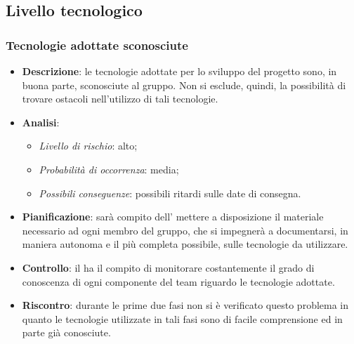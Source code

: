 	\subsection{Livello tecnologico}
		\subsubsection{Tecnologie adottate sconosciute}
			\begin{itemize}
				\item \textbf{Descrizione}: le tecnologie adottate per lo sviluppo del progetto sono, in buona parte, sconosciute al gruppo. Non si esclude, quindi, la possibilità di trovare ostacoli nell'utilizzo di tali tecnologie.
				\item \textbf{Analisi}:
					\begin{itemize}
						\item \textit{Livello di rischio}: alto;
						\item \textit{Probabilità di occorrenza}: media;
						\item \textit{Possibili conseguenze}: possibili ritardi sulle date di consegna.
					\end{itemize}
				\item \textbf{Pianificazione}: sarà compito dell' mettere a disposizione il materiale necessario ad ogni membro del gruppo, che si impegnerà a documentarsi, in maniera autonoma e il più completa possibile, sulle tecnologie da utilizzare.
				\item \textbf{Controllo}: il  ha il compito di monitorare costantemente il grado di conoscenza di ogni componente del team riguardo le tecnologie adottate.
				\item \textbf{Riscontro}: durante le prime due fasi non si è verificato questo problema in quanto le tecnologie utilizzate in tali fasi sono di facile comprensione ed in parte già conosciute.
			\end{itemize}

